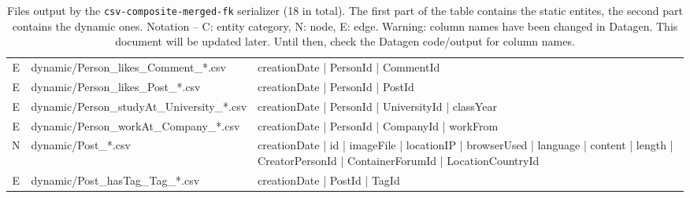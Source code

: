 \begin{table}[htb]
\begin{tabularx}{\linewidth}{|c|l|X|}
            E                    & dynamic/Person\_likes\_Comment\_*.csv        & creationDate | PersonId | CommentId \\
            E                    & dynamic/Person\_likes\_Post\_*.csv           & creationDate | PersonId | PostId \\
            E                    & dynamic/Person\_studyAt\_University\_*.csv   & creationDate | PersonId | UniversityId | classYear \\
            E                    & dynamic/Person\_workAt\_Company\_*.csv       & creationDate | PersonId | CompanyId | workFrom \\
            \hline
            N                    & dynamic/Post\_*.csv                          & creationDate | id | imageFile | locationIP | browserUsed | language | content | length | CreatorPersonId | ContainerForumId | LocationCountryId \\
            E                    & dynamic/Post\_hasTag\_Tag\_*.csv             & creationDate | PostId | TagId \\
            \hline
        \end{tabularx}
    \caption{Files output by the \texttt{csv-composite-merged-fk} serializer (18 in total). The first part of the table contains the static entites, the second part contains the dynamic ones. Notation -- C: entity category, N: node, E: edge. Warning: column names have been changed in Datagen. This document will be updated later. Until then, check the Datagen code/output for column names.}
    \label{table:csv-composite-merged-fk}
\end{table}
